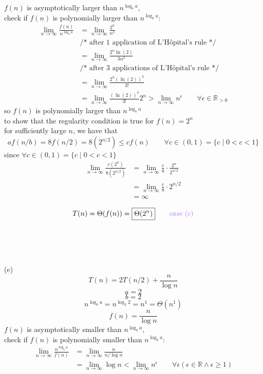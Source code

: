 \documentclass[12pt,border=4pt,multi]{article}%
\begin{document}
$f(n)$ is asymptotically larger than $n^{\log_b a}$,\\
check if $f(n)$ is polynomially larger than $n^{\log_b a}$:
\begin{align*}
\lim_{n \rightarrow \infty} \frac{f(n)}{n^{\log_b a}} &= \lim_{n \rightarrow \infty} \frac{2^n}{n^3}\\
&\text{/* after 1 application of L'Hôpital's rule */}\\
&= \lim_{n \rightarrow \infty} \frac{2^n \ln(2)}{3n^2}\\
&\text{/* after 3 applications of L'Hôpital's rule */}\\
&= \lim_{n \rightarrow \infty} \frac{2^n (\ln(2))^3}{3!}\\
&= \lim_{n \rightarrow \infty} \frac{(\ln(2))^3}{3!}2^n > \lim_{n \rightarrow \infty} n^{\epsilon} \qquad \forall \epsilon \in \mathbb{R}_{>0}
\end{align*}
so $f(n)$ is polynomially larger than $n^{\log_b a}$\\
to show that the regularity condition is true for $f(n) = 2^n$\\
for sufficiently large $n$, we have that 
\[af(n/b) = 8f(n/2) = 8(2^{n/2}) \leq cf(n) \qquad \forall c \in (0, 1) = \{c \;|\; 0 < c < 1\}\]
since $ \forall c \in (0, 1) = \{c \;|\; 0 < c < 1\}$
\begin{align*}
\lim_{n \rightarrow \infty} \frac{c(2^n)}{8(2^{n/2})} &= \lim_{n \rightarrow \infty} \frac{c}{8} \cdot \frac{2^n}{2^{n/2}}\\
&= \lim_{n \rightarrow \infty} \frac{c}{8} \cdot 2^{n/2}\\
&= \infty\\
\end{align*}
\[T(n) = \Theta(f(n)) = \boxed{\Theta(2^n)} \qquad \textcolor{orchid}{case\;(c)}\]
\\
\\
\\
\\
(e)
\[T(n) = 2T(n/2) + \frac{n}{\log n}\]
\[a = 2\]
\[b = 2\]
\[n^{\log_b a} = n^{\log_2 2} = n^1 = \Theta(n^1)\]
\[f(n) = \frac{n}{\log n}\]
$f(n)$ is asymptotically smaller than $n^{\log_b a}$,\\
check if $f(n)$ is polynomially smaller than $n^{\log_b a}$:
\begin{align*}
\lim_{n \rightarrow \infty} \frac{n^{\log_b a}}{f(n)} &=  \lim_{n \rightarrow \infty}\frac{n}{n/\log n}\\
&= \lim_{n \rightarrow \infty}\log n < \lim_{n \rightarrow \infty} n^{\epsilon} \qquad \forall \epsilon (\epsilon \in \mathbb{R} \wedge \epsilon \geq 1)\\
\end{align*}
\end{document}
